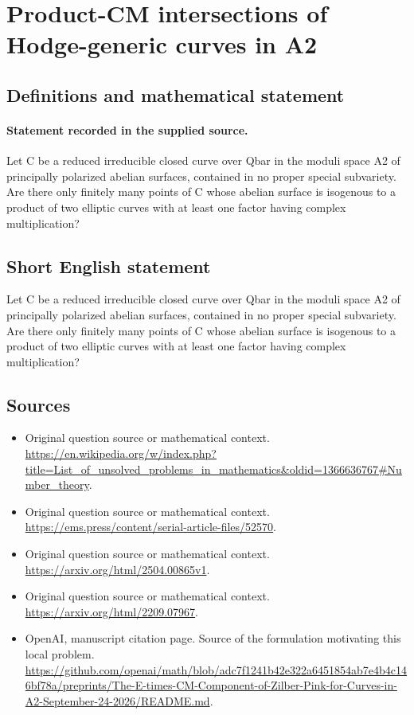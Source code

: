 \documentclass[11pt]{article}
\begin{document}
\section*{Product-CM intersections of Hodge-generic curves in A2}\label{30007252}
\subsection{Definitions and mathematical statement}
\paragraph{Statement recorded in the supplied source.}
Let C be a reduced irreducible closed curve over Qbar in the moduli space A2 of principally polarized abelian surfaces, contained in no proper special subvariety. Are there only finitely many points of C whose abelian surface is isogenous to a product of two elliptic curves with at least one factor having complex multiplication?
\subsection{Short English statement}
Let C be a reduced irreducible closed curve over Qbar in the moduli space A2 of principally polarized abelian surfaces, contained in no proper special subvariety. Are there only finitely many points of C whose abelian surface is isogenous to a product of two elliptic curves with at least one factor having complex multiplication?
\subsection{Sources}
\begin{itemize}
\item[S1] Original question source or mathematical context.
\url{https://en.wikipedia.org/w/index.php?title=List_of_unsolved_problems_in_mathematics&oldid=1366636767#Number_theory}.
\item[S2] Original question source or mathematical context.
\url{https://ems.press/content/serial-article-files/52570}.
\item[S3] Original question source or mathematical context.
\url{https://arxiv.org/html/2504.00865v1}.
\item[S4] Original question source or mathematical context.
\url{https://arxiv.org/html/2209.07967}.
\item[S5] OpenAI, manuscript citation page. Source of the formulation motivating this local problem.
\url{https://github.com/openai/math/blob/adc7f1241b42e322a6451854ab7e4b4c146bf78a/preprints/The-E-times-CM-Component-of-Zilber-Pink-for-Curves-in-A2-September-24-2026/README.md}.
\end{itemize}
\end{document}
